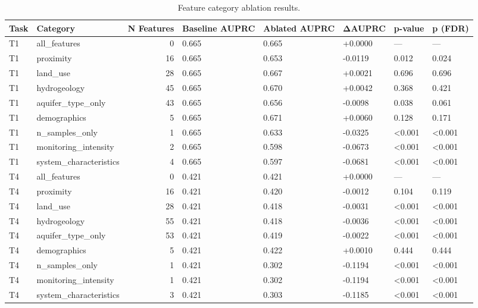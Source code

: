\begin{table}
\caption{Feature category ablation results.}
\label{tab:ext-ablation}
\begin{tabular}{llrlllll}
\toprule
Task & Category & N Features & Baseline AUPRC & Ablated AUPRC & ΔAUPRC & p-value & p (FDR) \\
\midrule
T1 & all_features & 0 & 0.665 & 0.665 & +0.0000 & — & — \\
T1 & proximity & 16 & 0.665 & 0.653 & -0.0119 & 0.012 & 0.024 \\
T1 & land_use & 28 & 0.665 & 0.667 & +0.0021 & 0.696 & 0.696 \\
T1 & hydrogeology & 45 & 0.665 & 0.670 & +0.0042 & 0.368 & 0.421 \\
T1 & aquifer_type_only & 43 & 0.665 & 0.656 & -0.0098 & 0.038 & 0.061 \\
T1 & demographics & 5 & 0.665 & 0.671 & +0.0060 & 0.128 & 0.171 \\
T1 & n_samples_only & 1 & 0.665 & 0.633 & -0.0325 & <0.001 & <0.001 \\
T1 & monitoring_intensity & 2 & 0.665 & 0.598 & -0.0673 & <0.001 & <0.001 \\
T1 & system_characteristics & 4 & 0.665 & 0.597 & -0.0681 & <0.001 & <0.001 \\
T4 & all_features & 0 & 0.421 & 0.421 & +0.0000 & — & — \\
T4 & proximity & 16 & 0.421 & 0.420 & -0.0012 & 0.104 & 0.119 \\
T4 & land_use & 28 & 0.421 & 0.418 & -0.0031 & <0.001 & <0.001 \\
T4 & hydrogeology & 55 & 0.421 & 0.418 & -0.0036 & <0.001 & <0.001 \\
T4 & aquifer_type_only & 53 & 0.421 & 0.419 & -0.0022 & <0.001 & <0.001 \\
T4 & demographics & 5 & 0.421 & 0.422 & +0.0010 & 0.444 & 0.444 \\
T4 & n_samples_only & 1 & 0.421 & 0.302 & -0.1194 & <0.001 & <0.001 \\
T4 & monitoring_intensity & 1 & 0.421 & 0.302 & -0.1194 & <0.001 & <0.001 \\
T4 & system_characteristics & 3 & 0.421 & 0.303 & -0.1185 & <0.001 & <0.001 \\
\bottomrule
\end{tabular}
\end{table}
